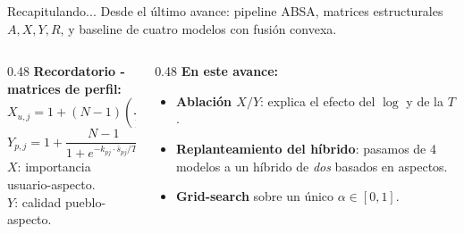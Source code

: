 \documentclass[aspectratio=169,11pt]{beamer}
\begin{document}
\begin{frame}{Recapitulando...}
	\small
	Desde el \'ultimo avance: pipeline ABSA, matrices estructurales $A,X,Y,R$, y baseline de cuatro modelos con fusi\'on convexa.
	\vspace{0.6em}
	\begin{columns}[T]
		\begin{column}{0.48\linewidth}
			\textbf{Recordatorio - matrices de perfil:}
			\[
				X_{u,j}=1+(N-1)\!\left(\frac{2}{1+e^{-t_{uj}/T_x}}-1\right)
			\]
			\[
				Y_{p,j}=1+\frac{N-1}{1+e^{-k_{pj}\cdot \bar{s}_{pj}/T_y}}
			\]
			$X$: importancia usuario-aspecto.\\
			$Y$: calidad pueblo-aspecto.
		\end{column}
		\begin{column}{0.48\linewidth}
			\textbf{En este avance:}
			\begin{itemize}
				\item \textbf{Ablaci\'on $X/Y$}: explica el efecto del $\log$ y de la $T$.
				\item \textbf{Replanteamiento del h\'ibrido}: pasamos de 4 modelos a un h\'ibrido de \emph{dos} basados en aspectos.
				\item \textbf{Grid-search} sobre un \'unico $\alpha \in [0,1]$.
			\end{itemize}
		\end{column}
	\end{columns}
\end{frame}
\end{document}

